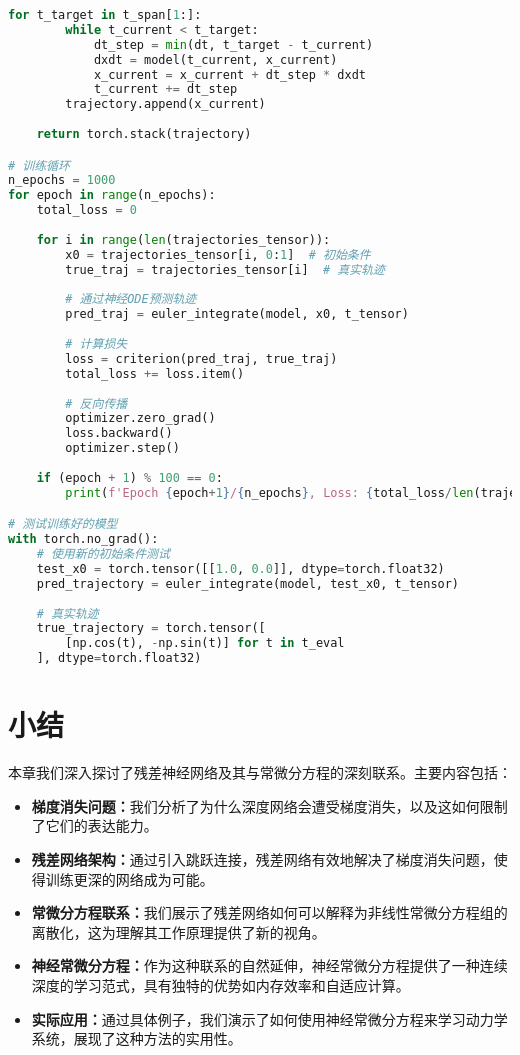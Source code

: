 \begin{lstlisting}[language=Python, caption={神经ODE学习动力学系统的PyTorch实现}, label=code:neural_ode_example]
    for t_target in t_span[1:]:
        while t_current < t_target:
            dt_step = min(dt, t_target - t_current)
            dxdt = model(t_current, x_current)
            x_current = x_current + dt_step * dxdt
            t_current += dt_step
        trajectory.append(x_current)
    
    return torch.stack(trajectory)

# 训练循环
n_epochs = 1000
for epoch in range(n_epochs):
    total_loss = 0
    
    for i in range(len(trajectories_tensor)):
        x0 = trajectories_tensor[i, 0:1]  # 初始条件
        true_traj = trajectories_tensor[i]  # 真实轨迹
        
        # 通过神经ODE预测轨迹
        pred_traj = euler_integrate(model, x0, t_tensor)
        
        # 计算损失
        loss = criterion(pred_traj, true_traj)
        total_loss += loss.item()
        
        # 反向传播
        optimizer.zero_grad()
        loss.backward()
        optimizer.step()
    
    if (epoch + 1) % 100 == 0:
        print(f'Epoch {epoch+1}/{n_epochs}, Loss: {total_loss/len(trajectories_tensor):.6f}')

# 测试训练好的模型
with torch.no_grad():
    # 使用新的初始条件测试
    test_x0 = torch.tensor([[1.0, 0.0]], dtype=torch.float32)
    pred_trajectory = euler_integrate(model, test_x0, t_tensor)
    
    # 真实轨迹
    true_trajectory = torch.tensor([
        [np.cos(t), -np.sin(t)] for t in t_eval
    ], dtype=torch.float32)
\end{lstlisting}

\section{小结}
\label{sec:summary}

本章我们深入探讨了残差神经网络及其与常微分方程的深刻联系。主要内容包括：

\begin{itemize}
\item \textbf{梯度消失问题：}我们分析了为什么深度网络会遭受梯度消失，以及这如何限制了它们的表达能力。

\item \textbf{残差网络架构：}通过引入跳跃连接，残差网络有效地解决了梯度消失问题，使得训练更深的网络成为可能。

\item \textbf{常微分方程联系：}我们展示了残差网络如何可以解释为非线性常微分方程组的离散化，这为理解其工作原理提供了新的视角。

\item \textbf{神经常微分方程：}作为这种联系的自然延伸，神经常微分方程提供了一种连续深度的学习范式，具有独特的优势如内存效率和自适应计算。

\item \textbf{实际应用：}通过具体例子，我们演示了如何使用神经常微分方程来学习动力学系统，展现了这种方法的实用性。
\end{itemize}

